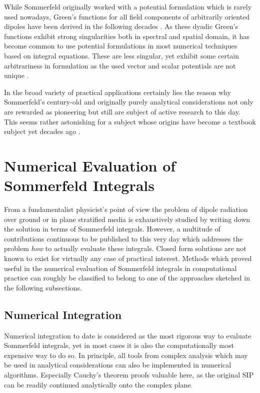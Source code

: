 While Sommerfeld originally worked with a potential formulation which is rarely
used nowadays, Green's functions for all field components of
arbitrarily oriented dipoles have been derived in the following decades 
\cite{Michalski2005}.
As these dyadic Green's functions exhibit strong singularities both in 
spectral and spatial domain, it has become common to use potential formulations
in most numerical techniques based on integral equations.
These are less singular, yet exhibit some certain arbitrariness in formulation 
as the used vector and scalar potentials are not unique
\cite{Michalski1990,Michalski1990a,Eibert1997,Michalski1997}.

In the broad variety of practical applications certainly lies the reason why
Sommerfeld's century-old and originally purely analytical considerations not
only are rewarded as pioneering but still are subject of active research to
this day.
This seems rather astonishing for a subject whose origins have become a textbook
subject yet decades ago \cite{Michalski2015, Michalski2016b, Mosig2021,koh2021}.








\section{Numerical Evaluation of Sommerfeld Integrals}

From a fundamentalist physicist's point of view the problem of dipole radiation
over ground or in plane stratified media is exhaustively studied by writing
down the solution in terms of Sommerfeld integrals.
However, a multitude of contributions continuous to be published to this very
day which addresses the problem \emph{how} to actually evaluate these integrals.
Closed form solutions are not known to exist for virtually any case of practical
interest.
Methods which proved useful in the numerical evaluation of Sommerfeld integrals
in computational practice can roughly be classified to belong to one of the 
approaches sketched in the following subsections.





\subsection{Numerical Integration}
Numerical integration to date is considered as the most rigorous way to evaluate
Sommerfeld integrals, yet in most cases it is also the computationally most
expensive way to do so.
In principle, all tools from complex analysis which may be used in
analytical considerations can also be implemented in numerical algorithms.
Especially Cauchy's theorem proofs valuable here, as the original
\ac{SIP} can be readily continued analytically onto the complex plane.

